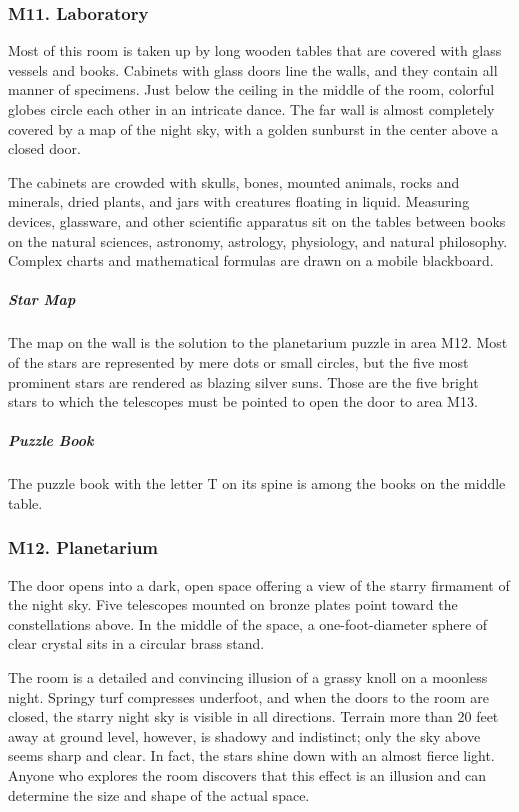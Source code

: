 \documentclass[10pt,a4paper,twoside,bg=print,twocolumn,openany,nodeprecatedcode]{dndbook}
\begin{document}
\subsubsection{M11. Laboratory}
\begin{DndReadAloud}{}
Most of this room is taken up by long wooden tables that are covered with glass vessels and books. Cabinets with glass doors line the walls, and they contain all manner of specimens. Just below the ceiling in the middle of the room, colorful globes circle each other in an intricate dance. The far wall is almost completely covered by a map of the night sky, with a golden sunburst in the center above a closed door.

\end{DndReadAloud}

The cabinets are crowded with skulls, bones, mounted animals, rocks and minerals, dried plants, and jars with creatures floating in liquid. Measuring devices, glassware, and other scientific apparatus sit on the tables between books on the natural sciences, astronomy, astrology, physiology, and natural philosophy. Complex charts and mathematical formulas are drawn on a mobile blackboard.

\subparagraph{Star Map}
The map on the wall is the solution to the planetarium puzzle in area M12. Most of the stars are represented by mere dots or small circles, but the five most prominent stars are rendered as blazing silver suns. Those are the five bright stars to which the telescopes must be pointed to open the door to area M13.

\subparagraph{Puzzle Book}
The puzzle book with the letter T on its spine is among the books on the middle table.

\subsubsection{M12. Planetarium}
\begin{DndReadAloud}{}
The door opens into a dark, open space offering a view of the starry firmament of the night sky. Five telescopes mounted on bronze plates point toward the constellations above. In the middle of the space, a one-foot-diameter sphere of clear crystal sits in a circular brass stand.

\end{DndReadAloud}

The room is a detailed and convincing illusion of a grassy knoll on a moonless night. Springy turf compresses underfoot, and when the doors to the room are closed, the starry night sky is visible in all directions. Terrain more than 20 feet away at ground level, however, is shadowy and indistinct; only the sky above seems sharp and clear. In fact, the stars shine down with an almost fierce light. Anyone who explores the room discovers that this effect is an illusion and can determine the size and shape of the actual space.
\end{document}
